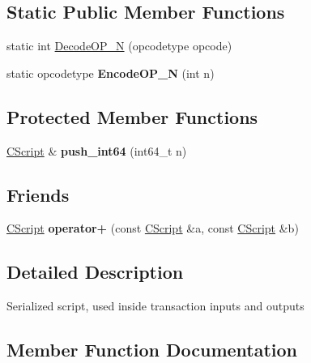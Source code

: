 \subsection*{Static Public Member Functions}
\begin{DoxyCompactItemize}
\item 
static int \mbox{\hyperlink{class_c_script_a7f975fca06b3e9a17da8ba23c7647e2e}{Decode\+O\+P\+\_\+N}} (opcodetype opcode)
\item 
\mbox{\label{class_c_script_ae81b29e2e86343bedacfd4e0ef87bca6}} 
static opcodetype {\bfseries Encode\+O\+P\+\_\+N} (int n)
\end{DoxyCompactItemize}
\subsection*{Protected Member Functions}
\begin{DoxyCompactItemize}
\item 
\mbox{\label{class_c_script_ad802105f1515b4953ecbe6aeab2ee1ca}} 
\mbox{\hyperlink{class_c_script}{C\+Script}} \& {\bfseries push\+\_\+int64} (int64\+\_\+t n)
\end{DoxyCompactItemize}
\subsection*{Friends}
\begin{DoxyCompactItemize}
\item 
\mbox{\label{class_c_script_a533d7ad1fc14f689b3aec7d7af7800ee}} 
\mbox{\hyperlink{class_c_script}{C\+Script}} {\bfseries operator+} (const \mbox{\hyperlink{class_c_script}{C\+Script}} \&a, const \mbox{\hyperlink{class_c_script}{C\+Script}} \&b)
\end{DoxyCompactItemize}


\subsection{Detailed Description}
Serialized script, used inside transaction inputs and outputs 

\subsection{Member Function Documentation}
\mbox{\label{class_c_script_a7f975fca06b3e9a17da8ba23c7647e2e}} 
